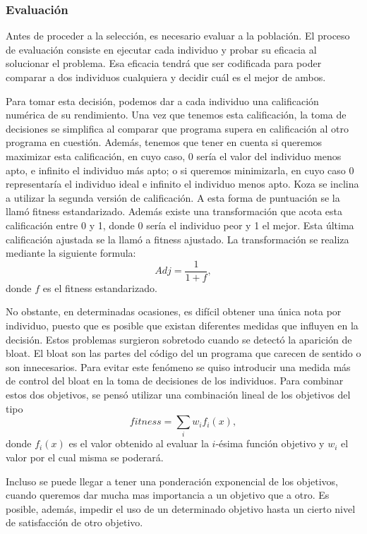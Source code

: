 \subsubsection{Evaluación}

Antes de proceder a la selección, es necesario evaluar a la población. El
proceso de evaluación consiste en ejecutar cada individuo y probar su eficacia
al solucionar el problema. Esa eficacia tendrá que ser codificada para poder
comparar a dos individuos cualquiera y decidir cuál es el mejor de ambos.

Para tomar esta decisión, podemos dar a cada individuo una calificación
numérica de su rendimiento. Una vez que tenemos esta calificación, la toma de
decisiones se simplifica al comparar que programa supera en calificación al otro
programa en cuestión. Además, tenemos que tener en cuenta si queremos maximizar
esta calificación, en cuyo caso, 0 sería el valor del individuo menos apto, e
infinito el individuo más apto; o si queremos minimizarla, en cuyo caso 0
representaría el individuo ideal e infinito el individuo menos apto.  Koza se
inclina a utilizar la segunda versión de calificación. A esta forma de puntuación
se la llamó fitness estandarizado. Además existe una transformación que acota
esta calificación entre 0 y 1, donde 0 sería el individuo peor y 1 el mejor. Esta
última calificación ajustada se la llamó a fitness ajustado. La transformación se
realiza mediante la siguiente formula:
\begin{equation}
   Adj = \frac{1}{1+f},
\end{equation} donde $f$ es el fitness estandarizado.


No obstante, en determinadas ocasiones, es difícil obtener una única nota por individuo, puesto que es posible
que existan diferentes medidas que influyen en la decisión.  Estos problemas surgieron sobretodo cuando se
detectó la aparición de bloat. El bloat son las partes del código del un
programa que carecen de sentido o son innecesarios. Para evitar este fenómeno se quiso introducir una medida más de control del bloat en la toma de decisiones de los individuos. Para combinar estos dos objetivos, se pensó utilizar una combinación lineal de los objetivos del tipo
\begin{equation}
   fitness = \sum_{i}w_if_i(x),
\end{equation}
donde $f_i(x)$ es el valor obtenido al evaluar la $i$-ésima función objetivo y  $w_i$ el valor por el cual
misma se poderará.

Incluso se puede llegar a tener una ponderación exponencial de los objetivos, cuando queremos dar mucha mas
importancia a un objetivo que a otro. Es posible, además, impedir el uso de un determinado objetivo hasta un
cierto nivel de satisfacción de otro objetivo.

